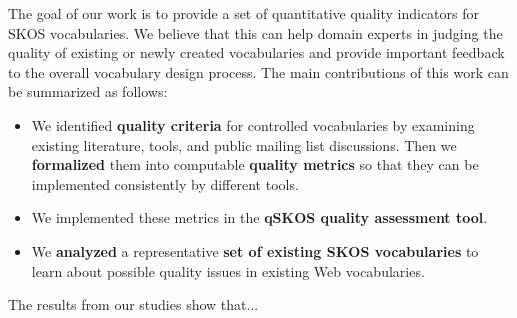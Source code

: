 
The goal of our work is to provide a set of quantitative quality indicators for SKOS vocabularies. We believe that this can help domain experts in judging the quality of existing or newly created vocabularies and provide important feedback to the overall vocabulary design process. The main contributions of this work can be summarized as follows:

\begin{itemize}

	\item We identified \textbf{quality criteria} for controlled vocabularies by examining existing literature, tools, and public mailing list discussions. Then we \textbf{formalized} them into computable \textbf{quality metrics} so that they can be implemented consistently by different tools.
	
	\item We implemented these metrics in the \textbf{qSKOS quality assessment tool}.

	\item We \textbf{analyzed} a representative \textbf{set of existing SKOS vocabularies} to learn about possible quality issues in existing Web vocabularies.

\end{itemize}

The results from our studies show that... 
